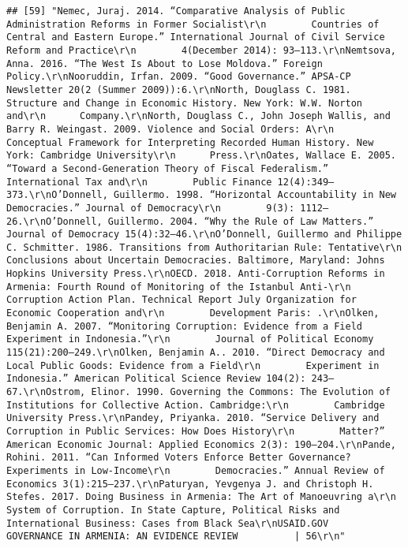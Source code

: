 \documentclass[
]{article}
\begin{document}
\begin{verbatim}
## [59] "Nemec, Juraj. 2014. “Comparative Analysis of Public Administration Reforms in Former Socialist\r\n        Countries of Central and Eastern Europe.” International Journal of Civil Service Reform and Practice\r\n        4(December 2014): 93–113.\r\nNemtsova, Anna. 2016. “The West Is About to Lose Moldova.” Foreign Policy.\r\nNooruddin, Irfan. 2009. “Good Governance.” APSA-CP Newsletter 20(2 (Summer 2009)):6.\r\nNorth, Douglass C. 1981. Structure and Change in Economic History. New York: W.W. Norton and\r\n      Company.\r\nNorth, Douglass C., John Joseph Wallis, and Barry R. Weingast. 2009. Violence and Social Orders: A\r\n      Conceptual Framework for Interpreting Recorded Human History. New York: Cambridge University\r\n      Press.\r\nOates, Wallace E. 2005. “Toward a Second-Generation Theory of Fiscal Federalism.” International Tax and\r\n        Public Finance 12(4):349–373.\r\nO’Donnell, Guillermo. 1998. “Horizontal Accountability in New Democracies.” Journal of Democracy\r\n        9(3): 1112–26.\r\nO’Donnell, Guillermo. 2004. “Why the Rule of Law Matters.” Journal of Democracy 15(4):32–46.\r\nO’Donnell, Guillermo and Philippe C. Schmitter. 1986. Transitions from Authoritarian Rule: Tentative\r\n        Conclusions about Uncertain Democracies. Baltimore, Maryland: Johns Hopkins University Press.\r\nOECD. 2018. Anti-Corruption Reforms in Armenia: Fourth Round of Monitoring of the Istanbul Anti-\r\n        Corruption Action Plan. Technical Report July Organization for Economic Cooperation and\r\n        Development Paris: .\r\nOlken, Benjamin A. 2007. “Monitoring Corruption: Evidence from a Field Experiment in Indonesia.”\r\n        Journal of Political Economy 115(21):200–249.\r\nOlken, Benjamin A.. 2010. “Direct Democracy and Local Public Goods: Evidence from a Field\r\n        Experiment in Indonesia.” American Political Science Review 104(2): 243–67.\r\nOstrom, Elinor. 1990. Governing the Commons: The Evolution of Institutions for Collective Action. Cambridge:\r\n        Cambridge University Press.\r\nPandey, Priyanka. 2010. “Service Delivery and Corruption in Public Services: How Does History\r\n        Matter?” American Economic Journal: Applied Economics 2(3): 190–204.\r\nPande, Rohini. 2011. “Can Informed Voters Enforce Better Governance? Experiments in Low-Income\r\n        Democracies.” Annual Review of Economics 3(1):215–237.\r\nPaturyan, Yevgenya J. and Christoph H. Stefes. 2017. Doing Business in Armenia: The Art of Manoeuvring a\r\n        System of Corruption. In State Capture, Political Risks and International Business: Cases from Black Sea\r\nUSAID.GOV                                                     GOVERNANCE IN ARMENIA: AN EVIDENCE REVIEW          | 56\r\n"                                                                                                                                                                                                                                                                                                                                                                                                                                                                                                                                                                                                  
\end{verbatim}
\end{document}
